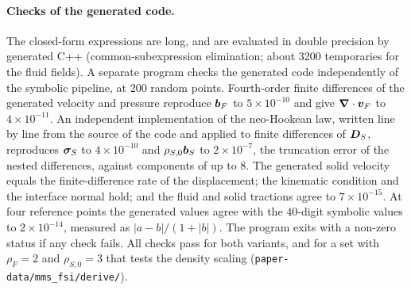 \paragraph{Checks of the generated code.}
The closed-form expressions are long, and are evaluated in double precision by generated C++ (common-subexpression elimination; about 3200 temporaries for the fluid fields).
A separate program checks the generated code independently of the symbolic pipeline, at 200 random points.
Fourth-order finite differences of the generated velocity and pressure reproduce $\boldsymbol{b}_F$ to $5\times10^{-10}$ and give $\boldsymbol{\nabla}\cdot\boldsymbol{v}_F$ to $4\times10^{-11}$.
An independent implementation of the neo-Hookean law, written line by line from the source of the code and applied to finite differences of $\boldsymbol{D}_S$, reproduces $\boldsymbol{\sigma}_S$ to $4\times10^{-10}$ and $\rho_{S,0}\boldsymbol{b}_S$ to $2\times10^{-7}$, the truncation error of the nested differences, against components of up to $8$.
The generated solid velocity equals the finite-difference rate of the displacement; the kinematic condition and the interface normal hold; and the fluid and solid tractions agree to $7\times10^{-15}$.
At four reference points the generated values agree with the $40$-digit symbolic values to $2\times10^{-14}$, measured as $|a - b|/(1 + |b|)$.
The program exits with a non-zero status if any check fails.
All checks pass for both variants, and for a set with $\rho_F = 2$ and $\rho_{S,0} = 3$ that tests the density scaling (\texttt{paper-data/mms\_fsi/derive/}).
